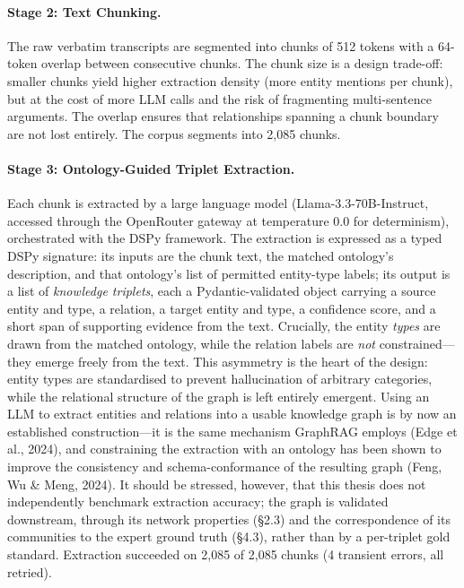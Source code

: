 \documentclass[11pt]{article}
\begin{document}
\paragraph{Stage 2: Text Chunking.}
The raw verbatim transcripts are segmented into chunks of 512 tokens with a 64-token overlap between consecutive chunks. The chunk size is a design trade-off: smaller chunks yield higher extraction density (more entity mentions per chunk), but at the cost of more LLM calls and the risk of fragmenting multi-sentence arguments. The overlap ensures that relationships spanning a chunk boundary are not lost entirely. The corpus segments into 2{,}085 chunks.

\paragraph{Stage 3: Ontology-Guided Triplet Extraction.}
Each chunk is extracted by a large language model (Llama-3.3-70B-Instruct, accessed through the OpenRouter gateway at temperature 0.0 for determinism), orchestrated with the DSPy framework. The extraction is expressed as a typed DSPy signature: its inputs are the chunk text, the matched ontology's description, and that ontology's list of permitted entity-type labels; its output is a list of \emph{knowledge triplets}, each a Pydantic-validated object carrying a source entity and type, a relation, a target entity and type, a confidence score, and a short span of supporting evidence from the text. Crucially, the entity \emph{types} are drawn from the matched ontology, while the relation labels are \emph{not} constrained---they emerge freely from the text. This asymmetry is the heart of the design: entity types are standardised to prevent hallucination of arbitrary categories, while the relational structure of the graph is left entirely emergent. Using an LLM to extract entities and relations into a usable knowledge graph is by now an established construction---it is the same mechanism GraphRAG employs (Edge et al., 2024), and constraining the extraction with an ontology has been shown to improve the consistency and schema-conformance of the resulting graph (Feng, Wu \& Meng, 2024). It should be stressed, however, that this thesis does not independently benchmark extraction accuracy; the graph is validated downstream, through its network properties (\S2.3) and the correspondence of its communities to the expert ground truth (\S4.3), rather than by a per-triplet gold standard. Extraction succeeded on 2{,}085 of 2{,}085 chunks (4 transient errors, all retried).
\end{document}
